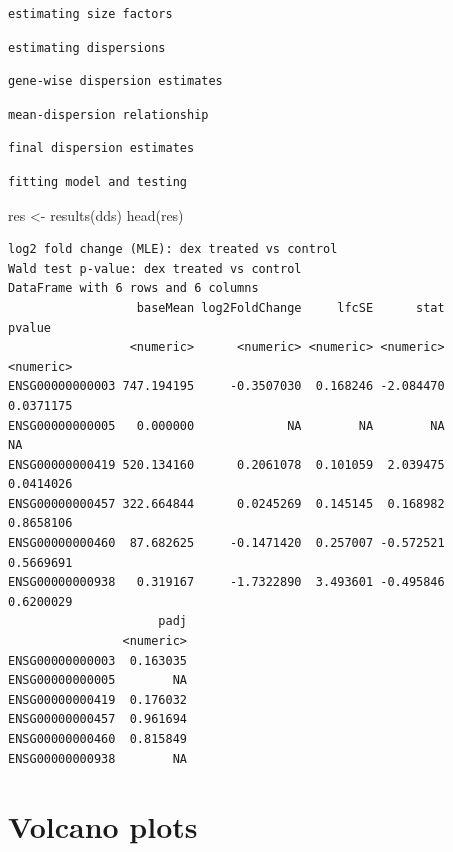 \documentclass[
  letterpaper,
  DIV=11,
  numbers=noendperiod]{scrartcl}
\newenvironment{Shaded}{\begin{snugshade}}{\end{snugshade}}
\newcommand{\FunctionTok}[1]{\textcolor[rgb]{0.28,0.35,0.67}{#1}}
\newcommand{\NormalTok}[1]{\textcolor[rgb]{0.00,0.23,0.31}{#1}}
\newcommand{\OtherTok}[1]{\textcolor[rgb]{0.00,0.23,0.31}{#1}}
\begin{document}
\begin{verbatim}
estimating size factors
\end{verbatim}

\begin{verbatim}
estimating dispersions
\end{verbatim}

\begin{verbatim}
gene-wise dispersion estimates
\end{verbatim}

\begin{verbatim}
mean-dispersion relationship
\end{verbatim}

\begin{verbatim}
final dispersion estimates
\end{verbatim}

\begin{verbatim}
fitting model and testing
\end{verbatim}

\begin{Shaded}
\begin{Highlighting}[]
\NormalTok{res }\OtherTok{\textless{}{-}} \FunctionTok{results}\NormalTok{(dds)}
\FunctionTok{head}\NormalTok{(res)}
\end{Highlighting}
\end{Shaded}

\begin{verbatim}
log2 fold change (MLE): dex treated vs control 
Wald test p-value: dex treated vs control 
DataFrame with 6 rows and 6 columns
                  baseMean log2FoldChange     lfcSE      stat    pvalue
                 <numeric>      <numeric> <numeric> <numeric> <numeric>
ENSG00000000003 747.194195     -0.3507030  0.168246 -2.084470 0.0371175
ENSG00000000005   0.000000             NA        NA        NA        NA
ENSG00000000419 520.134160      0.2061078  0.101059  2.039475 0.0414026
ENSG00000000457 322.664844      0.0245269  0.145145  0.168982 0.8658106
ENSG00000000460  87.682625     -0.1471420  0.257007 -0.572521 0.5669691
ENSG00000000938   0.319167     -1.7322890  3.493601 -0.495846 0.6200029
                     padj
                <numeric>
ENSG00000000003  0.163035
ENSG00000000005        NA
ENSG00000000419  0.176032
ENSG00000000457  0.961694
ENSG00000000460  0.815849
ENSG00000000938        NA
\end{verbatim}

\hypertarget{volcano-plots}{%
\section{Volcano plots}\label{volcano-plots}}
\end{document}
